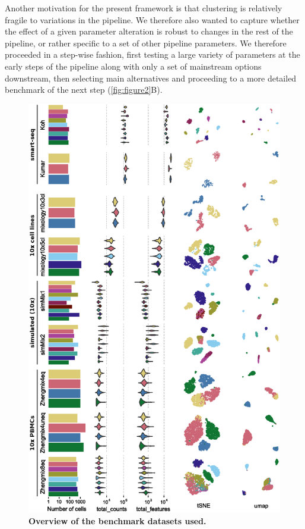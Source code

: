 \documentclass{bmcart}
\begin{document}
Another motivation for the present framework is that clustering is relatively fragile to variations in the pipeline. We therefore also wanted to capture whether the effect of a given parameter alteration is robust to changes in the rest of the pipeline, or rather specific to a set of other pipeline parameters. We therefore proceeded in a step-wise fashion, first testing a large variety of parameters at the early steps of the pipeline along with only a set of mainstream options downstream, then selecting main alternatives and proceeding to a more detailed benchmark of the next step (\ref{fig:figure2}B).

\begin{figure}
    \centering
    \includegraphics[width=\textwidth,keepaspectratio]{dataset_description}
    \caption{\textbf{Overview of the benchmark datasets used.}}
    \label{fig:figure1}
\end{figure}
\end{document}
